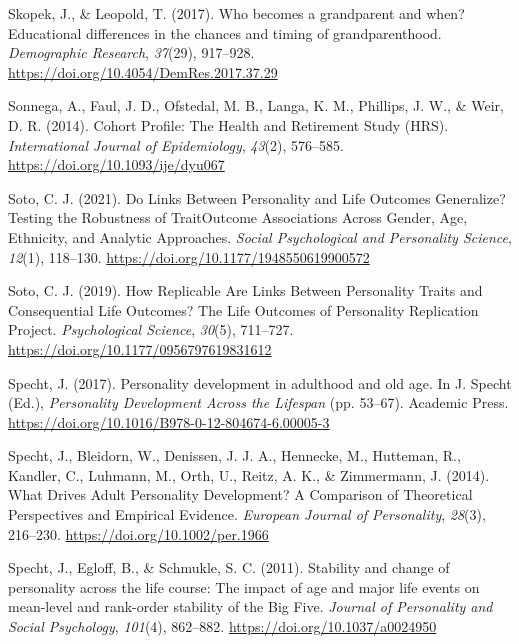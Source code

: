 \documentclass[
  english,
  man, noextraspace]{apa7}
\begin{document}
\leavevmode\hypertarget{ref-skopekWhoBecomesGrandparent2017}{}%
Skopek, J., \& Leopold, T. (2017). Who becomes a grandparent and when? Educational differences in the chances and timing of grandparenthood. \emph{Demographic Research}, \emph{37}(29), 917--928. \url{https://doi.org/10.4054/DemRes.2017.37.29}

\leavevmode\hypertarget{ref-sonnegaCohortProfileHealth2014}{}%
Sonnega, A., Faul, J. D., Ofstedal, M. B., Langa, K. M., Phillips, J. W., \& Weir, D. R. (2014). Cohort Profile: The Health and Retirement Study (HRS). \emph{International Journal of Epidemiology}, \emph{43}(2), 576--585. \url{https://doi.org/10.1093/ije/dyu067}

\leavevmode\hypertarget{ref-sotoLinksPersonalityLife2021}{}%
Soto, C. J. (2021). Do Links Between Personality and Life Outcomes Generalize? Testing the Robustness of TraitOutcome Associations Across Gender, Age, Ethnicity, and Analytic Approaches. \emph{Social Psychological and Personality Science}, \emph{12}(1), 118--130. \url{https://doi.org/10.1177/1948550619900572}

\leavevmode\hypertarget{ref-sotoHowReplicableAre2019}{}%
Soto, C. J. (2019). How Replicable Are Links Between Personality Traits and Consequential Life Outcomes? The Life Outcomes of Personality Replication Project. \emph{Psychological Science}, \emph{30}(5), 711--727. \url{https://doi.org/10.1177/0956797619831612}

\leavevmode\hypertarget{ref-spechtPersonalityDevelopmentAdulthood2017}{}%
Specht, J. (2017). Personality development in adulthood and old age. In J. Specht (Ed.), \emph{Personality Development Across the Lifespan} (pp. 53--67). Academic Press. \url{https://doi.org/10.1016/B978-0-12-804674-6.00005-3}

\leavevmode\hypertarget{ref-spechtWhatDrivesAdult2014}{}%
Specht, J., Bleidorn, W., Denissen, J. J. A., Hennecke, M., Hutteman, R., Kandler, C., Luhmann, M., Orth, U., Reitz, A. K., \& Zimmermann, J. (2014). What Drives Adult Personality Development? A Comparison of Theoretical Perspectives and Empirical Evidence. \emph{European Journal of Personality}, \emph{28}(3), 216--230. \url{https://doi.org/10.1002/per.1966}

\leavevmode\hypertarget{ref-spechtStabilityChangePersonality2011}{}%
Specht, J., Egloff, B., \& Schmukle, S. C. (2011). Stability and change of personality across the life course: The impact of age and major life events on mean-level and rank-order stability of the Big Five. \emph{Journal of Personality and Social Psychology}, \emph{101}(4), 862--882. \url{https://doi.org/10.1037/a0024950}
\end{document}

